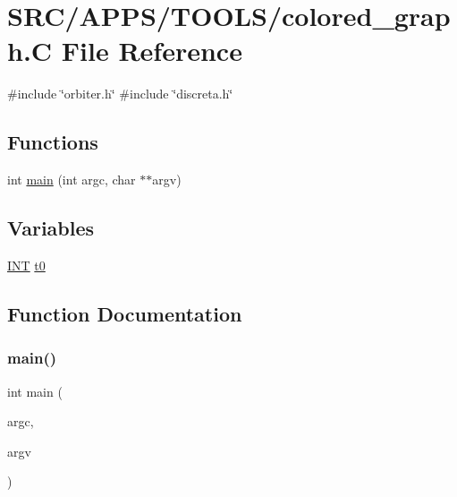 \hypertarget{_a_p_p_s_2_t_o_o_l_s_2colored__graph_8_c}{}\section{S\+R\+C/\+A\+P\+P\+S/\+T\+O\+O\+L\+S/colored\+\_\+graph.C File Reference}
\label{_a_p_p_s_2_t_o_o_l_s_2colored__graph_8_c}
{\ttfamily \#include \char`\"{}orbiter.\+h\char`\"{}}\newline
{\ttfamily \#include \char`\"{}discreta.\+h\char`\"{}}\newline
\subsection*{Functions}
\begin{DoxyCompactItemize}
\item 
int \mbox{\hyperlink{_a_p_p_s_2_t_o_o_l_s_2colored__graph_8_c_a3c04138a5bfe5d72780bb7e82a18e627}{main}} (int argc, char $\ast$$\ast$argv)
\end{DoxyCompactItemize}
\subsection*{Variables}
\begin{DoxyCompactItemize}
\item 
\mbox{\hyperlink{galois_8h_a09fddde158a3a20bd2dcadb609de11dc}{I\+NT}} \mbox{\hyperlink{_a_p_p_s_2_t_o_o_l_s_2colored__graph_8_c_a4268f4fe222ffb119218a0199f5e1904}{t0}}
\end{DoxyCompactItemize}


\subsection{Function Documentation}
\mbox{\label{_a_p_p_s_2_t_o_o_l_s_2colored__graph_8_c_a3c04138a5bfe5d72780bb7e82a18e627}} 
\subsubsection{\texorpdfstring{main()}{main()}}
{\footnotesize\ttfamily int main (\begin{DoxyParamCaption}\item[{int}]{argc,  }\item[{char $\ast$$\ast$}]{argv }\end{DoxyParamCaption})}



